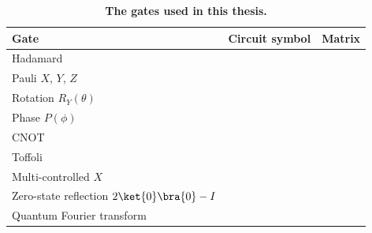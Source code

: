 \begin{table}[htbp]
    \centering
    \caption[The gates used in this thesis]{\textbf{The gates used in this thesis.}}
    \label{tab:gates}
    \small
    \begin{tabular}{@{}l l l@{}}
        \toprule
        Gate & Circuit symbol & Matrix \\
        \midrule
        Hadamard & & \\
        Pauli $X$, $Y$, $Z$ & & \\
        Rotation $R_Y(\theta)$ & & \\
        Phase $P(\phi)$ & & \\
        CNOT & & \\
        Toffoli & & \\
        Multi-controlled $X$ & & \\
        Zero-state reflection $2\ket{0}\bra{0} - I$ & & \\
        Quantum Fourier transform & & \\
        \bottomrule
    \end{tabular}
\end{table}
